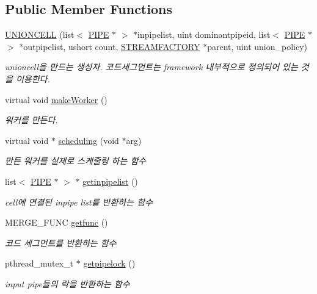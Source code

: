 \subsection*{Public Member Functions}
\begin{DoxyCompactItemize}
\item 
\hyperlink{classUNIONCELL_ad0a662c44a37238e6f948d2481a0438a}{U\+N\+I\+O\+N\+C\+E\+L\+L} (list$<$ \hyperlink{classPIPE}{P\+I\+P\+E} $\ast$ $>$ $\ast$inpipelist, uint dominantpipeid, list$<$ \hyperlink{classPIPE}{P\+I\+P\+E} $\ast$ $>$ $\ast$outpipelist, ushort count, \hyperlink{classSTREAMFACTORY}{S\+T\+R\+E\+A\+M\+F\+A\+C\+T\+O\+R\+Y} $\ast$parent, uint union\+\_\+policy)
\begin{DoxyCompactList}\small\item\em unioncell을 만드는 생성자. 코드세그먼트는 framework 내부적으로 정의되어 있는 것을 이용한다. \end{DoxyCompactList}\item 
virtual void \hyperlink{classUNIONCELL_ac57cb2a3f83bf219133a9d942c24f5aa}{make\+Worker} ()
\begin{DoxyCompactList}\small\item\em 워커를 만든다. \end{DoxyCompactList}\item 
virtual void $\ast$ \hyperlink{classUNIONCELL_a0179dad91d30e7bca318bb7e3b4a4995}{scheduling} (void $\ast$arg)
\begin{DoxyCompactList}\small\item\em 만든 워커를 실제로 스케줄링 하는 함수 \end{DoxyCompactList}\item 
list$<$ \hyperlink{classPIPE}{P\+I\+P\+E} $\ast$ $>$ $\ast$ \hyperlink{classUNIONCELL_a23ad55db09a70ba74f2fcf630def1c3f}{getinpipelist} ()
\begin{DoxyCompactList}\small\item\em cell에 연결된 inpipe list를 반환하는 함수 \end{DoxyCompactList}\item 
M\+E\+R\+G\+E\+\_\+\+F\+U\+N\+C \hyperlink{classUNIONCELL_a3ac189ca39d6445213365cadf9e21726}{getfunc} ()
\begin{DoxyCompactList}\small\item\em 코드 세그먼트를 반환하는 함수 \end{DoxyCompactList}\item 
pthread\+\_\+mutex\+\_\+t $\ast$ \hyperlink{classUNIONCELL_a42d955ed8ce559f41bd4837eda14a4ee}{getpipelock} ()
\begin{DoxyCompactList}\small\item\em input pipe들의 락을 반환하는 함수 \end{DoxyCompactList}\item 

\end{DoxyCompactItemize}
